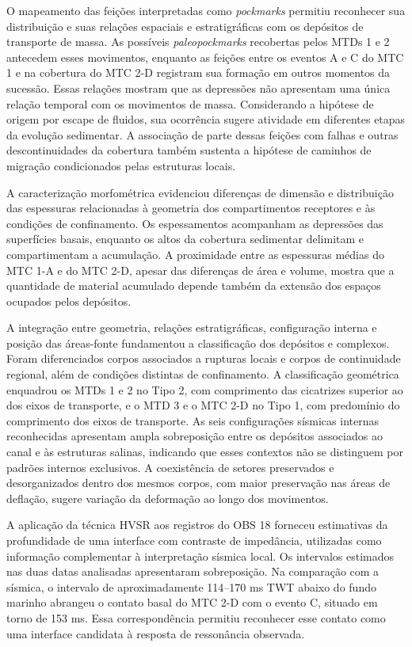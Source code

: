 O mapeamento das feições interpretadas como \textit{pockmarks} permitiu reconhecer sua distribuição e suas relações espaciais e estratigráficas com os depósitos de transporte de massa. As possíveis \textit{paleopockmarks} recobertas pelos MTDs 1 e 2 antecedem esses movimentos, enquanto as feições entre os eventos A e C do MTC 1 e na cobertura do MTC 2-D registram sua formação em outros momentos da sucessão. Essas relações mostram que as depressões não apresentam uma única relação temporal com os movimentos de massa. Considerando a hipótese de origem por escape de fluidos, sua ocorrência sugere atividade em diferentes etapas da evolução sedimentar. A associação de parte dessas feições com falhas e outras descontinuidades da cobertura também sustenta a hipótese de caminhos de migração condicionados pelas estruturas locais.

A caracterização morfométrica evidenciou diferenças de dimensão e distribuição das espessuras relacionadas à geometria dos compartimentos receptores e às condições de confinamento. Os espessamentos acompanham as depressões das superfícies basais, enquanto os altos da cobertura sedimentar delimitam e compartimentam a acumulação. A proximidade entre as espessuras médias do MTC 1-A e do MTC 2-D, apesar das diferenças de área e volume, mostra que a quantidade de material acumulado depende também da extensão dos espaços ocupados pelos depósitos.

A integração entre geometria, relações estratigráficas, configuração interna e posição das áreas-fonte fundamentou a classificação dos depósitos e complexos. Foram diferenciados corpos associados a rupturas locais e corpos de continuidade regional, além de condições distintas de confinamento. A classificação geométrica enquadrou os MTDs 1 e 2 no Tipo 2, com comprimento das cicatrizes superior ao dos eixos de transporte, e o MTD 3 e o MTC 2-D no Tipo 1, com predomínio do comprimento dos eixos de transporte. As seis configurações sísmicas internas reconhecidas apresentam ampla sobreposição entre os depósitos associados ao canal e às estruturas salinas, indicando que esses contextos não se distinguem por padrões internos exclusivos. A coexistência de setores preservados e desorganizados dentro dos mesmos corpos, com maior preservação nas áreas de deflação, sugere variação da deformação ao longo dos movimentos.

A aplicação da técnica HVSR aos registros do OBS 18 forneceu estimativas da profundidade de uma interface com contraste de impedância, utilizadas como informação complementar à interpretação sísmica local. Os intervalos estimados nas duas datas analisadas apresentaram sobreposição. Na comparação com a sísmica, o intervalo de aproximadamente 114--170 ms TWT abaixo do fundo marinho abrangeu o contato basal do MTC 2-D com o evento C, situado em torno de 153 ms. Essa correspondência permitiu reconhecer esse contato como uma interface candidata à resposta de ressonância observada.

